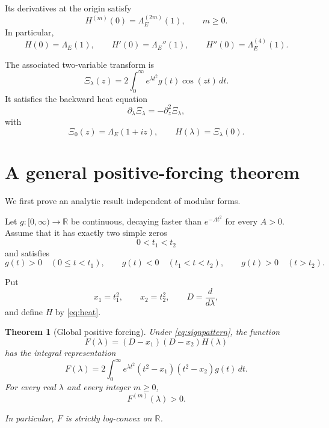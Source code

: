 \documentclass[11pt]{article}
\newtheorem{theorem}{Theorem}
\begin{document}
Its derivatives at the origin satisfy
\begin{equation}
H^{(m)}(0)=\Lambda_E^{(2m)}(1),
\qquad m\ge0.
\label{eq:derivatives}
\end{equation}
In particular,
\[
H(0)=\Lambda_E(1),\qquad
H'(0)=\Lambda_E''(1),\qquad
H''(0)=\Lambda_E^{(4)}(1).
\]

The associated two-variable transform is
\[
\Xi_\lambda(z)=
2\int_0^\infty
e^{\lambda t^2}g(t)\cos(zt)\,dt.
\]
It satisfies the backward heat equation
\[
\partial_\lambda\Xi_\lambda
=-\partial_z^2\Xi_\lambda,
\]
with
\[
\Xi_0(z)=\Lambda_E(1+iz),
\qquad
H(\lambda)=\Xi_\lambda(0).
\]

\section{A general positive-forcing theorem}

We first prove an analytic result independent
of modular forms.

Let $g:[0,\infty)\to\mathbb R$ be continuous,
decaying faster than $e^{-At^2}$ for every
$A>0$. Assume that it has exactly two simple
zeros
\[
0<t_1<t_2
\]
and satisfies
\begin{equation}
g(t)>0\quad(0\le t<t_1),\qquad
g(t)<0\quad(t_1<t<t_2),\qquad
g(t)>0\quad(t>t_2).
\label{eq:signpattern}
\end{equation}

Put
\[
x_1=t_1^2,\qquad x_2=t_2^2,
\qquad
D=\frac{d}{d\lambda},
\]
and define $H$ by \eqref{eq:heat}.

\begin{theorem}[Global positive forcing]
\label{thm:positive}
Under \eqref{eq:signpattern}, the function
\[
F(\lambda)=(D-x_1)(D-x_2)H(\lambda)
\]
has the integral representation
\begin{equation}
F(\lambda)=
2\int_0^\infty
e^{\lambda t^2}
(t^2-x_1)(t^2-x_2)g(t)\,dt.
\label{eq:forcing}
\end{equation}
For every real $\lambda$ and every integer $m\ge0$,
\begin{equation}
F^{(m)}(\lambda)>0.
\label{eq:allpositive}
\end{equation}

In particular, $F$ is strictly log-convex
on $\mathbb R$.
\end{theorem}
\end{document}
